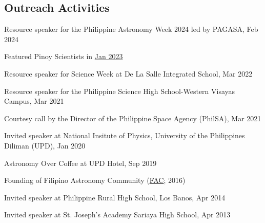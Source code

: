 \documentclass[12pt,letterpaper]{article}
\begin{document}
\subsection{Outreach Activities}
\begin{list}{}{\cvlist}
    \item Resource speaker for the Philippine Astronomy Week 2024 led by PAGASA, Feb 2024
    \item Featured Pinoy Scientists in \href{https://www.facebook.com/pinoyscientists/posts/pfbid0Lj83pJZaaU35tdSpz5UKgkAodhBqMzudUjCS7z4UV32zqiqmkQzT7LdtpGTsu7Cql}{Jan 2023}
    \item Resource speaker for Science Week at De La Salle Integrated School, Mar 2022
    \item Resource speaker for the Philippine Science High School-Western Visayas Campus, Mar 2021
    \item Courtesy call by the Director of the Philippine Space Agency (PhilSA), Mar 2021
    \item Invited speaker at National Insitute of Physics, University of the Philippines Diliman (UPD), Jan 2020
    \item Astronomy Over Coffee at UPD Hotel, Sep 2019
    \item Founding of Filipino Astronomy Community (\href{https://www.facebook.com/groups/filastrocomm}{FAC}; 2016)
    \item Invited speaker at Philippine Rural High School, Los Banos, Apr 2014
    \item Invited speaker at St. Joseph's Academy Sariaya High School, Apr 2013
\end{list}


\end{document}
